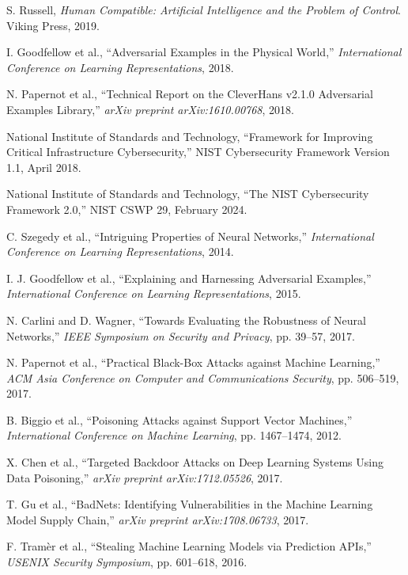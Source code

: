 \documentclass[11pt,letterpaper]{article}
\begin{document}

\begin{thebibliography}{99}

S. Russell, \emph{Human Compatible: Artificial Intelligence and the Problem of Control}. Viking Press, 2019.

I. Goodfellow et al., ``Adversarial Examples in the Physical World,'' \emph{International Conference on Learning Representations}, 2018.

N. Papernot et al., ``Technical Report on the CleverHans v2.1.0 Adversarial Examples Library,'' \emph{arXiv preprint arXiv:1610.00768}, 2018.

National Institute of Standards and Technology, ``Framework for Improving Critical Infrastructure Cybersecurity,'' NIST Cybersecurity Framework Version 1.1, April 2018.

National Institute of Standards and Technology, ``The NIST Cybersecurity Framework 2.0,'' NIST CSWP 29, February 2024.

C. Szegedy et al., ``Intriguing Properties of Neural Networks,'' \emph{International Conference on Learning Representations}, 2014.

I. J. Goodfellow et al., ``Explaining and Harnessing Adversarial Examples,'' \emph{International Conference on Learning Representations}, 2015.

N. Carlini and D. Wagner, ``Towards Evaluating the Robustness of Neural Networks,'' \emph{IEEE Symposium on Security and Privacy}, pp. 39--57, 2017.

N. Papernot et al., ``Practical Black-Box Attacks against Machine Learning,'' \emph{ACM Asia Conference on Computer and Communications Security}, pp. 506--519, 2017.

B. Biggio et al., ``Poisoning Attacks against Support Vector Machines,'' \emph{International Conference on Machine Learning}, pp. 1467--1474, 2012.

X. Chen et al., ``Targeted Backdoor Attacks on Deep Learning Systems Using Data Poisoning,'' \emph{arXiv preprint arXiv:1712.05526}, 2017.

T. Gu et al., ``BadNets: Identifying Vulnerabilities in the Machine Learning Model Supply Chain,'' \emph{arXiv preprint arXiv:1708.06733}, 2017.

F. Tramèr et al., ``Stealing Machine Learning Models via Prediction APIs,'' \emph{USENIX Security Symposium}, pp. 601--618, 2016.


\end{thebibliography}
\end{document}
